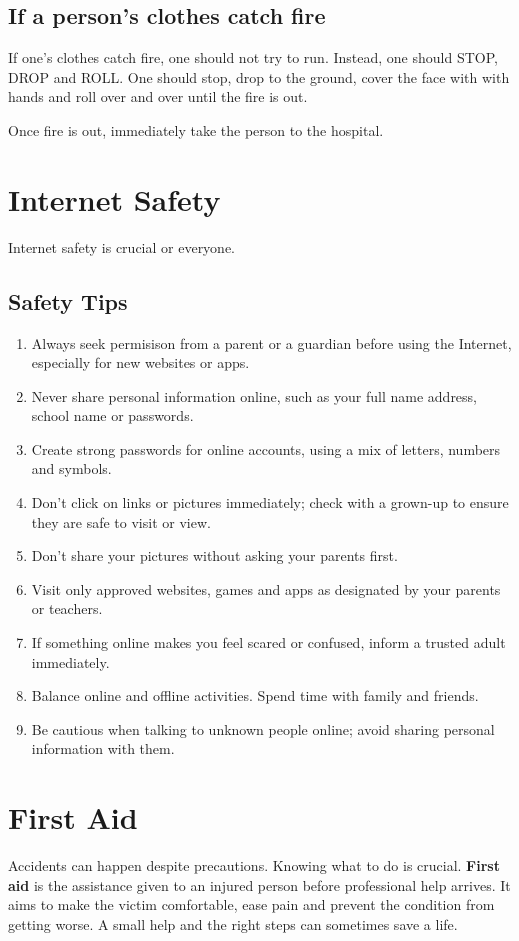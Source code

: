 \subsection{\textbf{If a person's clothes catch fire}}
If one's clothes catch fire, one should not try to run. Instead, one should STOP, DROP and ROLL. One should stop, drop to the ground, cover the face with with hands and roll over and over until the fire is out.
\vspace{0.1in}
\par
Once fire is out, immediately take the person to the hospital.
\vspace{2in}
\section{Internet Safety}
Internet safety is crucial or everyone.
\vspace{0.6in}
\subsection{Safety Tips}
\begin{enumerate}
    \item Always seek permisison from a parent or a guardian before using the Internet, especially for new websites or apps.
    \item Never share personal information online, such as your full name address, school name or passwords.
    \item Create strong passwords for online accounts, using a mix of letters, numbers and symbols.
    \item Don't click on links or pictures immediately; check with a grown-up to ensure they are safe to visit or view.
    \item Don't share your pictures without asking your parents first.
    \item Visit only approved websites, games and apps as designated by your parents or teachers.
    \item If something online makes you feel scared or confused, inform a trusted adult immediately.
    \item Balance online and offline activities. Spend time with family and friends.
    \item Be cautious when talking to unknown people online; avoid sharing personal information with them.
\end{enumerate}
\section{First Aid}
 Accidents can happen despite precautions. Knowing what to do is crucial. \textbf{First aid} is the assistance given to an injured person before professional help arrives. It aims to make the victim comfortable, ease pain and prevent the condition from getting worse. A small help and the right steps can sometimes save a life.

